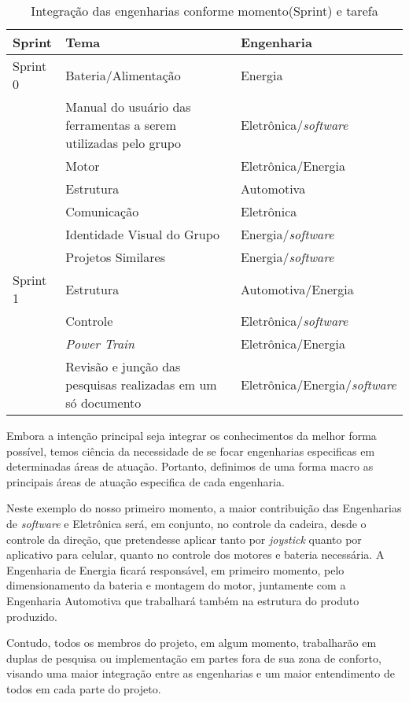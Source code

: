 \begin{table}[!ht]
\centering
\caption{Integração das engenharias conforme momento(Sprint) e tarefa}
\begin{tabular}{|p{2cm}|p{6cm}|p{5cm}|}
\hline
Sprint & Tema & Engenharia \\ \hline
Sprint 0 & Bateria/Alimentação & Energia \\ \hline
 & Manual do usuário das ferramentas a serem utilizadas pelo grupo & Eletrônica/\textit{software} \\ \hline
 & Motor & Eletrônica/Energia \\ \hline
 & Estrutura & Automotiva \\ \hline
 & Comunicação & Eletrônica \\ \hline
 & Identidade Visual do Grupo & Energia/\textit{software} \\ \hline
 & Projetos Similares & Energia/\textit{software} \\ \hline
Sprint 1 & Estrutura & Automotiva/Energia \\ \hline
 & Controle & Eletrônica/\textit{software} \\ \hline
 & \textit{Power Train} & Eletrônica/Energia \\ \hline
 & Revisão e junção das pesquisas realizadas em um só documento & Eletrônica/Energia/\textit{software} \\ \hline
\end{tabular}
\label{tab:integracao}
\end{table}

Embora a intenção principal seja integrar os conhecimentos da melhor forma possível, temos ciência da necessidade de se focar engenharias especificas em determinadas áreas de atuação. Portanto, definimos de uma forma macro as principais áreas de atuação especifica de cada engenharia.

Neste exemplo do nosso primeiro momento, a maior contribuição das Engenharias de \textit{software} e Eletrônica será, em conjunto, no controle da cadeira, desde o controle da direção, que pretendesse aplicar tanto por \textit{joystick} quanto por aplicativo para celular, quanto no controle dos motores e bateria necessária. A Engenharia de Energia ficará responsável, em primeiro momento, pelo dimensionamento da bateria e montagem do motor, juntamente com a Engenharia Automotiva que trabalhará também na estrutura do produto produzido.

Contudo, todos os membros do projeto, em algum momento, trabalharão em duplas de pesquisa ou implementação em partes fora de sua zona de conforto, visando uma maior integração entre as engenharias e um maior entendimento de todos em cada parte do projeto.
